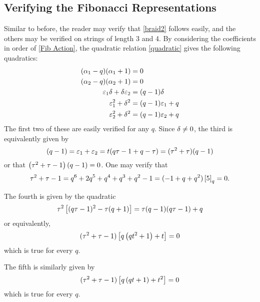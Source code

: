 \documentclass{amsart}
\begin{document}
\subsection{Verifying the Fibonacci Representations} 
\label{Fib Relations}
Similar to before, the reader may verify that \eqref{braid2} follows easily, and the others may be verified on strings of length 3 and 4.
By considering the coefficients in order of \eqref{Fib Action}, the quadratic relation \eqref{quadratic} gives the following quadratics:
\begin{equation}
  \begin{split}
    (\alpha_1 - q)(\alpha_1 + 1) &= 0\\
    (\alpha_2 - q)(\alpha_2 + 1) &= 0\\
    \varepsilon_1\delta + \delta\varepsilon_2 &= (q-1)\delta\\
    \varepsilon_1^2 + \delta^2 &= (q -1)\varepsilon_1 + q\\
    \varepsilon_2^2 + \delta^2 &= (q -1)\varepsilon_2 + q
  \end{split}
\end{equation}
The first two of these are easily verified for any $q$.
Since $\delta \neq 0$, the third is equivalently given by
\[
  (q - 1) = \varepsilon_1 + \varepsilon_2 = t(q\tau - 1 + q - \tau) = (\tau^2 + \tau)(q - 1)
\]
or that $\left( \tau^2 + \tau - 1 \right)(q-1) = 0$.
One may verify that \[\tau^2 + \tau - 1 = q^6 + 2q^5 + q^4 + q^3 + q^2 - 1 = (-1+q+q^2)\left[ 5 \right]_q = 0.\]

The fourth is given by the quadratic
\[
  \tau^2\left[ (q\tau-1)^2 - \tau(q+1) \right] = \tau(q-1)(q\tau - 1) + q
\]
or equivalently,
\[
  (\tau^2 + \tau - 1)\left[ q\left( qt^2 + 1 \right) + t \right] = 0
\]
which is true for every $q$.

The fifth is similarly given by
\[
  (\tau^2 + \tau - 1)\left[ q\left( qt + 1 \right) + t^2 \right] = 0 
\]
which is true for every $q$.
\end{document}
